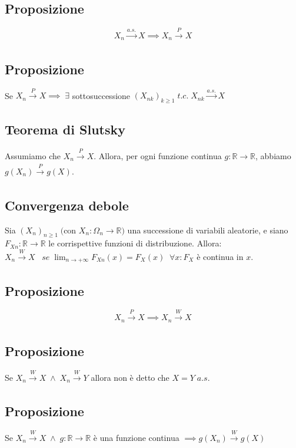 \documentclass{article}
\begin{document}
\subsection*{Proposizione}
\[ X_{n} \xrightarrow[]{a.s.}X \implies X_{n} \xrightarrow[]{P}X \]

\subsection*{Proposizione}
Se $X_{n} \xrightarrow[]{P}X \implies \; \exists$ sottosuccessione $(X_{nk})_{k\geq 1} \; t.c. \; X_{nk} \xrightarrow[]{a.s.}X$

\subsection*{Teorema di Slutsky}
Assumiamo che $X_{n} \xrightarrow[]{P}X$. Allora, per ogni funzione continua $g: \mathbb{R}\to \mathbb{R}$, abbiamo $g(X_{n}) \xrightarrow[]{P}g(X)$.

\subsection*{Convergenza debole}
Sia $(X_{n})_{n \geq 1} \; ($con $ X_{n}: \Omega_{n} \to \mathbb{R})$ una successione di variabili aleatorie, e siano $F_{Xn}: \mathbb{R}\to \mathbb{R}$ le corrispettive funzioni di distribuzione. Allora:\\
$X_{n} \xrightarrow[]{W}X \; \; \; se \; \lim_{n\to +\infty}F_{Xn}(x) = F_{X}(x) \; \; \forall x: F_{X}$ è continua in $x$.

\subsection*{Proposizione}
\[ X_{n} \xrightarrow[]{P}X \implies X_{n} \xrightarrow[]{W}X \]

\subsection*{Proposizione}
Se $X_{n} \xrightarrow[]{W}X \; \wedge \; X_{n} \xrightarrow[]{W}Y$ allora non è detto che $X=Y \; a.s.$

\subsection*{Proposizione}
Se $X_{n} \xrightarrow[]{W}X \; \wedge \; g: \mathbb{R}\to \mathbb{R}$ è una funzione continua $\implies g(X_{n}) \xrightarrow[]{W}g(X)$
\end{document}

